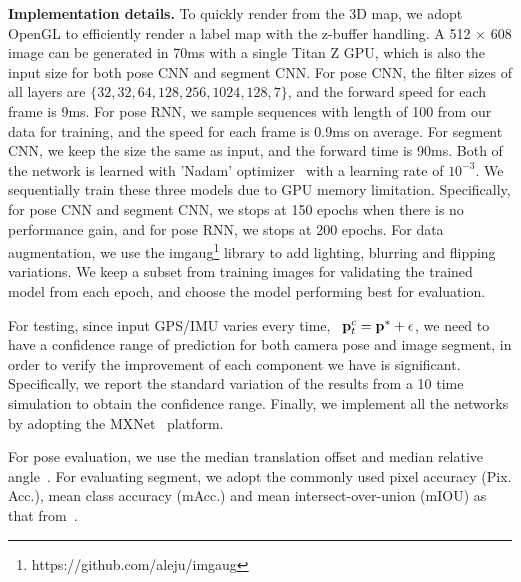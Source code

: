 \textbf{Implementation details.} To quickly render from the 3D map, we adopt OpenGL to efficiently render a label map with the z-buffer handling. A 512 $\times$ 608 image can be generated in 70ms with a single Titan Z GPU, which is also the input size for both pose CNN and segment CNN. 
For pose CNN, the filter sizes of all layers are $\{32, 32, 64, 128, 256, 1024, 128, 7\}$, and the forward speed for each frame is 9ms. For pose RNN, we sample sequences with length of 100 from our data for training, and the speed for each frame is 0.9ms on average.
For segment CNN, we keep the size the same as input, and the forward time is 90ms. 
Both of the network is learned with 'Nadam' optimizer~\cite{dozat2016incorporating} with a learning rate of $10^{-3}$. We sequentially train these three models due to GPU memory limitation.
Specifically, for pose CNN and segment CNN, we stops at 150 epochs when there is no performance gain, and for pose RNN, we stops at 200 epochs. For data augmentation, we use the imgaug\footnote{https://github.com/aleju/imgaug} library to add lighting, blurring and flipping variations. We keep a subset from training images for validating the trained model from each epoch, and choose the model performing best for evaluation.

For testing, since input GPS/IMU varies every time, \ie~${\mathbf p}_t^c={\mathbf p}^*+\epsilon$, we need to have a confidence range of prediction for both camera pose and image segment, in order to verify the improvement of each component we have is significant. Specifically, we report the standard variation of the results from a 10 time simulation to obtain the confidence range. Finally, we implement all the networks by adopting the MXNet~\cite{ChenLLLWWXXZZ15} platform.

For pose evaluation, we use the median translation offset and median relative angle~\cite{Kendall_2015_ICCV}. For evaluating segment, we adopt the commonly used pixel accuracy (Pix. Acc.), mean class accuracy (mAcc.) and mean intersect-over-union (mIOU) as that from~\cite{WuSH16e}.

